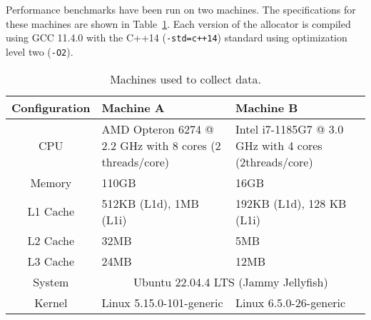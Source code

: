 Performance benchmarks have been run on two machines. The specifications for these machines are shown in Table~\ref{table:machines}. Each version of the allocator is compiled using GCC 11.4.0 with the C++14 (\texttt{-std=c++14}) standard using optimization level two (\texttt{-O2}).

\begin{table}[H]
\begin{tabular}{cp{5.54cm}p{5.54cm}}
Configuration & Machine A                                                & Machine B                                              \\ \hline
CPU           & AMD Opteron 6274 @ 2.2 GHz with 8 cores (2 threads/core) & Intel i7-1185G7 @ 3.0 GHz with 4 cores (2threads/core) \\ \hline
Memory        & 110GB                                                    & 16GB                                                   \\ \hline
L1 Cache      & 512KB (L1d), 1MB (L1i)                                   & 192KB (L1d), 128 KB (L1i)                              \\ \hline
L2 Cache      & 32MB                                                     & 5MB                                                    \\ \hline
L3 Cache      & 24MB                                                     & 12MB                                                   \\ \hline
System        & \multicolumn{2}{c}{Ubuntu 22.04.4 LTS (Jammy Jellyfish)}                                                          \\ \hline
Kernel        & Linux 5.15.0-101-generic                                 & Linux 6.5.0-26-generic                                
\end{tabular}
\caption{Machines used to collect data.}
\label{table:machines}
\end{table}

